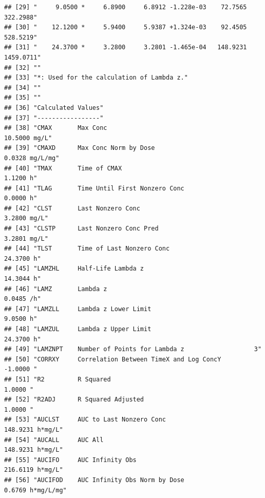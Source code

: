 \documentclass[9pt,]{krantz}
\begin{document}
\begin{verbatim}
## [29] "     9.0500 *     6.8900     6.8912 -1.228e-03    72.7565   322.2988"               
## [30] "    12.1200 *     5.9400     5.9387 +1.324e-03    92.4505   528.5219"               
## [31] "    24.3700 *     3.2800     3.2801 -1.465e-04   148.9231  1459.0711"               
## [32] ""                                                                                   
## [33] "*: Used for the calculation of Lambda z."                                           
## [34] ""                                                                                   
## [35] ""                                                                                   
## [36] "Calculated Values"                                                                  
## [37] "-----------------"                                                                  
## [38] "CMAX       Max Conc                                       10.5000 mg/L"             
## [39] "CMAXD      Max Conc Norm by Dose                           0.0328 mg/L/mg"          
## [40] "TMAX       Time of CMAX                                    1.1200 h"                
## [41] "TLAG       Time Until First Nonzero Conc                   0.0000 h"                
## [42] "CLST       Last Nonzero Conc                               3.2800 mg/L"             
## [43] "CLSTP      Last Nonzero Conc Pred                          3.2801 mg/L"             
## [44] "TLST       Time of Last Nonzero Conc                      24.3700 h"                
## [45] "LAMZHL     Half-Life Lambda z                             14.3044 h"                
## [46] "LAMZ       Lambda z                                        0.0485 /h"               
## [47] "LAMZLL     Lambda z Lower Limit                            9.0500 h"                
## [48] "LAMZUL     Lambda z Upper Limit                           24.3700 h"                
## [49] "LAMZNPT    Number of Points for Lambda z                   3"                       
## [50] "CORRXY     Correlation Between TimeX and Log ConcY        -1.0000 "                 
## [51] "R2         R Squared                                       1.0000 "                 
## [52] "R2ADJ      R Squared Adjusted                              1.0000 "                 
## [53] "AUCLST     AUC to Last Nonzero Conc                      148.9231 h*mg/L"           
## [54] "AUCALL     AUC All                                       148.9231 h*mg/L"           
## [55] "AUCIFO     AUC Infinity Obs                              216.6119 h*mg/L"           
## [56] "AUCIFOD    AUC Infinity Obs Norm by Dose                   0.6769 h*mg/L/mg"        

\end{verbatim}
\end{document}
